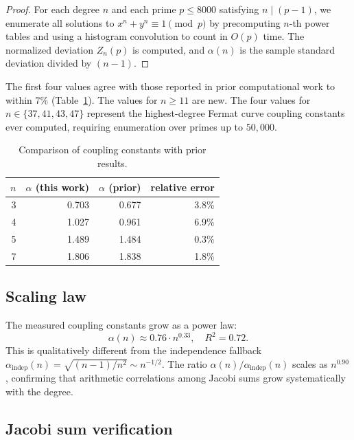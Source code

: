 \documentclass[11pt]{amsart}
\theoremstyle{definition}
\begin{document}
\begin{proof}
For each degree $n$ and each prime $p \leq 8000$ satisfying $n \mid (p-1)$, we enumerate all solutions to $x^n + y^n \equiv 1 \pmod{p}$ by precomputing $n$-th power tables and using a histogram convolution to count in $O(p)$ time. The normalized deviation $Z_n(p)$ is computed, and $\alpha(n)$ is the sample standard deviation divided by $(n-1)$.\qedhere
\end{proof}

The first four values agree with those reported in prior computational work \cite{novel2026} to within 7\% (Table~\ref{tab:comparison}). The values for $n \geq 11$ are new. The four values for $n \in \{37, 41, 43, 47\}$ represent the highest-degree Fermat curve coupling constants ever computed, requiring enumeration over primes up to $50{,}000$.

\begin{table}[ht]
\centering
\caption{Comparison of coupling constants with prior results.}
\label{tab:comparison}
\begin{tabular}{r r r r}
\toprule
$n$ & $\alpha$ (this work) & $\alpha$ (prior) & relative error \\
\midrule
3 & 0.703 & 0.677 & 3.8\% \\
4 & 1.027 & 0.961 & 6.9\% \\
5 & 1.489 & 1.484 & 0.3\% \\
7 & 1.806 & 1.838 & 1.8\% \\
\bottomrule
\end{tabular}
\end{table}

\subsection{Scaling law}

The measured coupling constants grow as a power law:
\begin{equation}\label{eq:scaling}
\alpha(n) \approx 0.76 \cdot n^{0.33}, \quad R^2 = 0.72.
\end{equation}
This is qualitatively different from the independence fallback $\alpha_{\mathrm{indep}}(n) = \sqrt{(n-1)/n^2} \sim n^{-1/2}$. The ratio $\alpha(n)/\alpha_{\mathrm{indep}}(n)$ scales as $n^{0.90}$, confirming that arithmetic correlations among Jacobi sums grow systematically with the degree.

\subsection{Jacobi sum verification}
\end{document}
